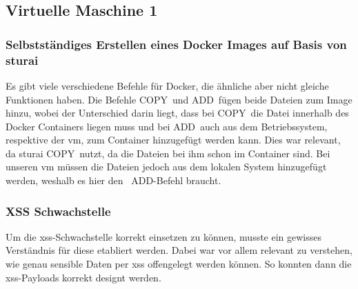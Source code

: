 \documentclass[10pt, a4paper,onecolumn ,titlepage]{article}
\begin{document}
    \subsection{Virtuelle Maschine 1}
    \label{subsec:vm1lessonslearned}

    \subsubsection{Selbstständiges Erstellen eines Docker Images auf Basis von sturai}
    \label{subsubsec:lessonslearnedDocker}
    Es gibt viele verschiedene Befehle für Docker, die ähnliche aber nicht gleiche Funktionen haben.
    Die Befehle \glqq COPY\grqq\ und \glqq ADD\grqq\ fügen beide Dateien zum Image hinzu, wobei der Unterschied darin liegt, dass bei \glqq COPY\grqq\ die Datei innerhalb des Docker Containers liegen muss und bei \glqq ADD\grqq\ auch aus dem Betriebssystem, respektive der \ac{vm}, zum Container hinzugefügt werden kann.
    Dies war relevant, da sturai \glqq COPY\grqq\ nutzt, da die Dateien bei ihm schon im Container sind. Bei unseren \ac{vm} müssen die Dateien jedoch aus dem lokalen System hinzugefügt werden, weshalb es hier den \glqq\ ADD\grqq-Befehl braucht.

    \subsubsection{XSS Schwachstelle}
    \label{subsubsec:lessonslearnedXSS}
    Um die \ac{xss}-Schwachstelle korrekt einsetzen zu können, musste ein gewisses Verständnis für diese etabliert werden.
    Dabei war vor allem relevant zu verstehen, wie genau sensible Daten per \ac{xss} offengelegt werden können.
    So konnten dann die \ac{xss}-Payloads korrekt designt werden.
\end{document}
